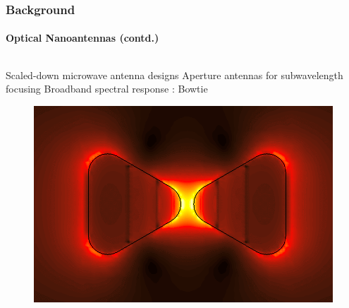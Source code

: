 \documentclass[mathserif,16pt,xcolor=table]{beamer}
\begin{document}
        \begin{frame}
          \frametitle{Background}
          \framesubtitle{Optical Nanoantennas (contd.)}

          \begin{columns} %
            \begin{column}{.45\textwidth}
              \begin{minipage}[T][.1\textheight][c]{\linewidth}
                \begin{outline}[itemize]
                  \1 Scaled-down microwave antenna designs
                    \2 Aperture antennas for subwavelength focusing
                    \2 Broadband spectral response : Bowtie
                \end{outline}
                \begin{figure}
                  \includegraphics[scale=.03]{bowtie_field_map.png}
                \end{figure}
              \end{minipage}
            \end{column}

\end{columns}
\end{frame}
\end{document}
